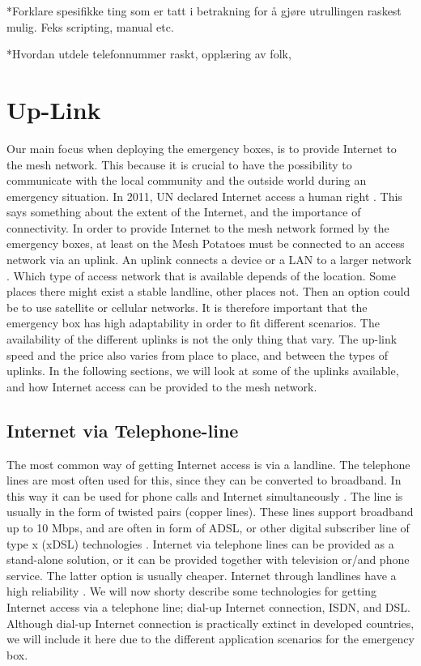 *Forklare spesifikke ting som er tatt i betrakning for å gjøre utrullingen raskest mulig. Feks scripting, manual etc. 

*Hvordan utdele telefonnummer raskt, opplæring av folk, 

\section{Up-Link}
Our main focus when deploying the emergency boxes, is to provide Internet to the mesh network. This because it is crucial to have the possibility to communicate with the local community and the outside world during an emergency situation. In 2011, UN declared Internet access a human right \cite{HR}. This says something about the extent of the Internet, and the importance of connectivity. In order to provide Internet to the mesh network formed by the emergency boxes, at least on the Mesh Potatoes must be connected to an access network via an uplink. An uplink connects a device or a LAN to a larger network \cite{uplink}. Which type of access network that is available depends of the location. Some places there might exist a stable landline, other places not. Then an option could be to use satellite or cellular networks. It is therefore important that the emergency box has high adaptability in order to fit different scenarios. The availability of the different uplinks is not the only thing that vary. The up-link speed and the price also varies from place to place, and between the types of uplinks. In the following sections, we will look at some of the uplinks available, and how Internet access can be provided to the mesh network.  

\subsection{Internet via Telephone-line}
The most common way of getting Internet access is via a landline. The telephone lines are most often used for this, since they can be converted to broadband. In this way it can be used for phone calls and Internet simultaneously \cite{internet}. The line is usually in the form of twisted pairs (copper lines). These lines support broadband up to 10 Mbps, and are often in form of ADSL, or other digital subscriber line of type x (xDSL) technologies \citep{audestad}. Internet via telephone lines can be provided as a stand-alone solution, or it can be provided together with television or/and phone service. The latter option is usually cheaper. Internet through landlines have a high reliability \cite{cablevssatellite}. We will now shorty describe some technologies for getting Internet access via a telephone line; dial-up Internet connection, ISDN, and DSL. Although dial-up Internet connection is practically extinct in developed countries, we will include it here due to the different application scenarios for the emergency box. 

